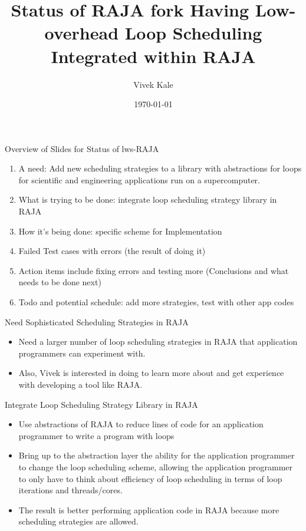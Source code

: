 \documentclass{beamer}
\title{Status of RAJA fork Having Low-overhead Loop Scheduling Integrated within RAJA}
\author{Vivek Kale}
\date{\today}
\begin{document}
 

\begin{frame}
\titlepage
\end{frame}

\begin{frame}[label=ovwlwsRAJAstatus]{Overview of Slides for Status of lws-RAJA}
\begin{enumerate} 
\item A need: Add new scheduling strategies to a library with abstractions for loops for scientific and engineering applications run on a supercomputer.
\item What is trying to be done: integrate loop scheduling strategy library in RAJA 
\item How it's being done: specific scheme for Implementation 
\item Failed Test cases with errors (the result of doing it) 
\item Action items include fixing errors and testing more (Conclusions and what needs to be done next)
\item Todo and potential schedule: add more strategies, test with other app codes
\end{enumerate}
\end{frame}

\begin{frame}{Need Sophisticated Scheduling Strategies in RAJA}
\begin{itemize}
\item Need a larger number of loop scheduling strategies in RAJA that application programmers can experiment with.
\item Also, Vivek is interested in doing to learn more about and get experience with developing a tool like RAJA. 
\end{itemize} 
\end{frame}


\begin{frame}{Integrate Loop Scheduling Strategy Library in RAJA}
\begin{itemize}
\item Use abstractions of RAJA to reduce lines of code for an application programmer to write a program with loops 
\item Bring up to the abstraction layer the ability for the application programmer to change the loop scheduling scheme, allowing the application programmer to only have to think about efficiency of loop scheduling in terms of loop iterations and threads/cores.  
\item The result is better performing application code in RAJA because more scheduling strategies are allowed. 
\end{itemize} 
\end{frame}
\end{document}
